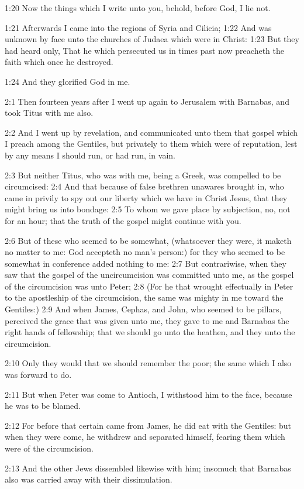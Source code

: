 1:20 Now the things which I write unto you, behold, before God, I lie not.

1:21 Afterwards I came into the regions of Syria and Cilicia; 1:22 And was unknown by face unto the churches of Judaea which were in Christ: 1:23 But they had heard only, That he which persecuted us in times past now preacheth the faith which once he destroyed.

1:24 And they glorified God in me.

2:1 Then fourteen years after I went up again to Jerusalem with Barnabas, and took Titus with me also.

2:2 And I went up by revelation, and communicated unto them that gospel which I preach among the Gentiles, but privately to them which were of reputation, lest by any means I should run, or had run, in vain.

2:3 But neither Titus, who was with me, being a Greek, was compelled to be circumcised: 2:4 And that because of false brethren unawares brought in, who came in privily to spy out our liberty which we have in Christ Jesus, that they might bring us into bondage: 2:5 To whom we gave place by subjection, no, not for an hour; that the truth of the gospel might continue with you.

2:6 But of these who seemed to be somewhat, (whatsoever they were, it maketh no matter to me: God accepteth no man's person:) for they who seemed to be somewhat in conference added nothing to me: 2:7 But contrariwise, when they saw that the gospel of the uncircumcision was committed unto me, as the gospel of the circumcision was unto Peter; 2:8 (For he that wrought effectually in Peter to the apostleship of the circumcision, the same was mighty in me toward the Gentiles:) 2:9 And when James, Cephas, and John, who seemed to be pillars, perceived the grace that was given unto me, they gave to me and Barnabas the right hands of fellowship; that we should go unto the heathen, and they unto the circumcision.

2:10 Only they would that we should remember the poor; the same which I also was forward to do.

2:11 But when Peter was come to Antioch, I withstood him to the face, because he was to be blamed.

2:12 For before that certain came from James, he did eat with the Gentiles: but when they were come, he withdrew and separated himself, fearing them which were of the circumcision.

2:13 And the other Jews dissembled likewise with him; insomuch that Barnabas also was carried away with their dissimulation.

